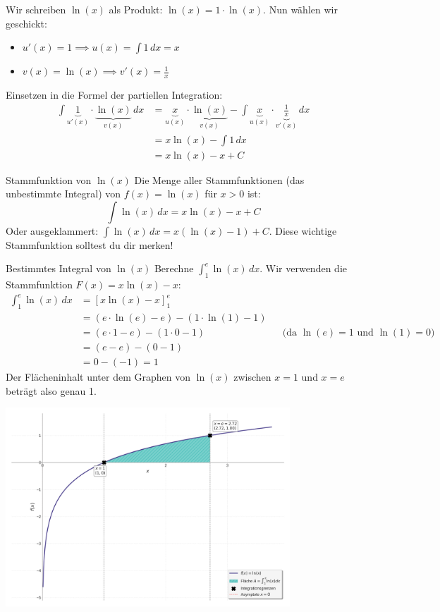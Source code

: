 Wir schreiben $\ln(x)$ als Produkt: $\ln(x) = 1 \cdot \ln(x)$.
Nun wählen wir geschickt:
\begin{itemize}
    \item $u'(x) = 1 \implies u(x) = \int 1 \,dx = x$
    \item $v(x) = \ln(x) \implies v'(x) = \frac{1}{x}$
\end{itemize}
Einsetzen in die Formel der partiellen Integration:
\begin{align*} \int \underbrace{1}_{u'(x)} \cdot \underbrace{\ln(x)}_{v(x)} \,dx &= \underbrace{x}_{u(x)} \cdot \underbrace{\ln(x)}_{v(x)} - \int \underbrace{x}_{u(x)} \cdot \underbrace{\frac{1}{x}}_{v'(x)} \,dx \\ &= x \ln(x) - \int 1 \,dx \\ &= x \ln(x) - x + C \end{align*}

\begin{merksatzumgebung}{Stammfunktion von $\ln(x)$}
Die Menge aller Stammfunktionen (das unbestimmte Integral) von $f(x) = \ln(x)$ für $x>0$ ist:
\[ \int \ln(x) \,dx = x \ln(x) - x + C \]
Oder ausgeklammert: $\int \ln(x) \,dx = x(\ln(x) - 1) + C$.
Diese wichtige Stammfunktion solltest du dir merken!
\end{merksatzumgebung}

\begin{beispielumgebung}{Bestimmtes Integral von \texorpdfstring{$\ln(x)$}{ln(x)}}
Berechne $\int_1^e \ln(x) \,dx$.
Wir verwenden die Stammfunktion $F(x) = x\ln(x) - x$:
\begin{align*} \int_1^e \ln(x) \,dx &= [x\ln(x) - x]_1^e \\ &= (e \cdot \ln(e) - e) - (1 \cdot \ln(1) - 1) \\ &= (e \cdot 1 - e) - (1 \cdot 0 - 1) && \text{(da } \ln(e)=1 \text{ und } \ln(1)=0) \\ &= (e - e) - (0 - 1) \\ &= 0 - (-1) = 1 \end{align*}
Der Flächeninhalt unter dem Graphen von $\ln(x)$ zwischen $x=1$ und $x=e$ beträgt also genau 1.
\begin{center}
    \includegraphics[width=0.8\textwidth]{grafiken/Integral_Flaeche_lnx.png}
    \label{fig:flaeche_lnx}
\end{center}
\end{beispielumgebung}

